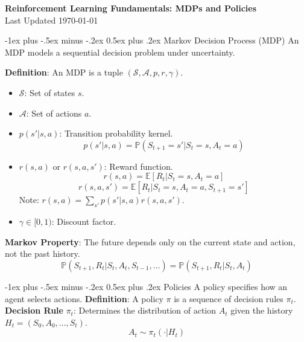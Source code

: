 \documentclass[10pt,landscape]{article}
\makeatletter
\renewcommand{\section}{\@startsection{section}{1}{0mm}%
                                {-1ex plus -.5ex minus -.2ex}%
                                {0.5ex plus .2ex}%
                                {\normalfont\large\bfseries}}
\makeatother
\begin{document}
\raggedright %
\footnotesize %

\begin{center}
    \Large{\vspace{-15mm}\textbf{Reinforcement Learning Fundamentals: MDPs and Policies}} \\ %
    \footnotesize{Last Updated \today}
    \vspace{-.4mm}
\end{center}
\begin{multicols}{3} %
    \setlength{\premulticols}{1pt}
    \setlength{\postmulticols}{1pt}
    \setlength{\multicolsep}{1pt}
    \setlength{\columnsep}{2pt} %
    \section{Markov Decision Process (MDP)}
    An MDP models a sequential decision problem under uncertainty.
    
    \textbf{Definition}: An MDP is a tuple $(\mathcal{S}, \mathcal{A}, p, r, \gamma)$.
    \begin{itemize}[label={--},leftmargin=4mm, itemsep=-.4mm]
        \item $\mathcal{S}$: Set of states $s$.
        \item $\mathcal{A}$: Set of actions $a$.
        \item $p(s'|s,a)$: Transition probability kernel.
              $$ p(s'|s,a) = \mathbb{P}(S_{t+1}=s' | S_t=s, A_t=a) $$
        \item $r(s,a)$ or $r(s,a,s')$: Reward function.
              $$ r(s,a) = \mathbb{E}[R_t | S_t=s, A_t=a] $$
              $$ r(s,a,s') = \mathbb{E}[R_t | S_t=s, A_t=a, S_{t+1}=s'] $$
              Note: $r(s,a) = \sum_{s'} p(s'|s,a) r(s,a,s')$.
        \item $\gamma \in [0, 1)$: Discount factor.
    \end{itemize}

    \textbf{Markov Property}: The future depends only on the current state and action, not the past history.
    $$ \mathbb{P}(S_{t+1}, R_t | S_t, A_t, S_{t-1}, \dots) = \mathbb{P}(S_{t+1}, R_t | S_t, A_t) $$

    \section{Policies}
    A policy specifies how an agent selects actions.
    \textbf{Definition}: A policy $\pi$ is a sequence of decision rules $\pi_t$.
    \textbf{Decision Rule} $\pi_t$: Determines the distribution of action $A_t$ given the history $H_t = (S_0, A_0, \dots, S_t)$.
    $$ A_t \sim \pi_t(\cdot | H_t) $$


\end{multicols}
\end{document}

